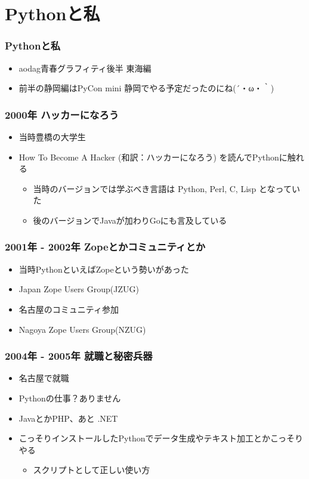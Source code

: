 \documentclass[aspectratio=169]{beamer}
\begin{document}
\section{Pythonと私}
\begin{frame}
\frametitle{Pythonと私}
\begin{itemize}
\item aodag青春グラフィティ後半 東海編
\item 前半の静岡編はPyCon mini 静岡でやる予定だったのにね(´・ω・｀)
\end{itemize}
\end{frame}

\begin{frame}
\frametitle{2000年 ハッカーになろう}

\begin{itemize}
\item 当時豊橋の大学生
\item How To Become A Hacker (和訳：ハッカーになろう) を読んでPythonに触れる
\begin{itemize}
\item 当時のバージョンでは学ぶべき言語は Python, Perl, C, Lisp となっていた
\item 後のバージョンでJavaが加わりGoにも言及している
\end{itemize}
\end{itemize}

\end{frame}

\begin{frame}
\frametitle{2001年 - 2002年 Zopeとかコミュニティとか}
\begin{itemize}
\item 当時PythonといえばZopeという勢いがあった
\item Japan Zope Users Group(JZUG)
\item 名古屋のコミュニティ参加
\item Nagoya Zope Users Group(NZUG)
\end{itemize}
\end{frame}

\begin{frame}
\frametitle{2004年 - 2005年 就職と秘密兵器}
\begin{itemize}
\item 名古屋で就職
\item Pythonの仕事？ありません
\item JavaとかPHP、あと .NET
\item こっそりインストールしたPythonでデータ生成やテキスト加工とかこっそりやる
\begin{itemize}
\item スクリプトとして正しい使い方
\end{itemize}
\end{itemize}
\end{frame}
\end{document}
